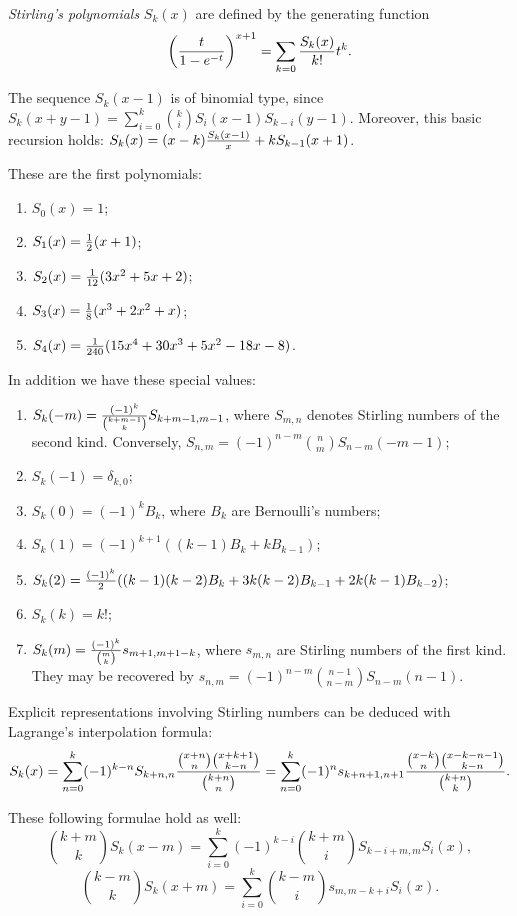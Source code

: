 \documentclass[12pt]{article}
\begin{document}
\emph{Stirling's polynomials}  $S_k(x)$ are defined by the generating function $$\left( {t \over {1-e^{-t}}} \right) ^{x+1}= \sum_{k=0} {S_k(x) \over k!} t^k.$$

The sequence $S_k(x-1)$ is of binomial type, since $S_k(x+y-1)= \sum_{i=0}^k {k \choose i} S_i(x-1) S_{k-i}(y-1)$. Moreover, this basic recursion holds: $S_k(x)= (x-k) {S_k(x-1) \over x} + k S_{k-1}(x+1)$. 

These are the first polynomials:
\begin{enumerate}
 \item $S_0(x)=1$;
 \item $S_1(x)= {1 \over 2}(x+1)$;
 \item $S_2(x)= {1 \over 12} (3 x^2 + 5x+ 2)$;
 \item $S_3(x)= {1 \over 8} (x^3+2 x^2+x)$;
 \item $S_4(x)= {1 \over 240} (15 x^4+ 30 x^3+5 x^2- 18x-8)$.
\end{enumerate}

In addition we have these special values:
\begin{enumerate}
 \item $S_k(-m)= {(-1)^k \over {k+m-1 \choose k}} S_{k+m-1,m-1}$, where $S_{m,n}$ denotes Stirling numbers of the second kind. Conversely, $S_{n,m}=(-1)^{n-m} {n \choose m} S_{n-m}(-m-1)$;
 \item $S_k(-1)= \delta_{k,0}$;
 \item $S_k(0)= (-1)^k B_k$, where $B_k$ are Bernoulli's numbers;
 \item $S_k(1)= (-1)^{k+1} ((k-1) B_k+ k B_{k-1})$;
 \item $S_k(2)= {(-1)^{k}\over 2} ((k-1)(k-2) B_k+ 3 k(k-2) B_{k-1}+ 2 k(k-1) B_{k-2})$;
 \item $S_k(k)= k!$;
 \item $S_k(m)= {(-1)^k \over {m \choose k}} s_{m+1, m+1-k}$, where $s_{m,n}$ are Stirling numbers of the first kind. They may be recovered by $s_{n,m}= (-1)^{n-m} {n-1 \choose n-m} S_{n-m}(n-1)$.
\end{enumerate}


Explicit representations involving Stirling numbers can be deduced with Lagrange's interpolation formula: $$S_k(x)= \sum_{n=0}^k (-1)^{k-n} S_{k+n,n} {{x+n \choose n} {x+k+1 \choose k-n} \over {k+n \choose n}} = \sum_{n=0}^k (-1)^n s_{k+n+1,n+1} {{x-k \choose n} {x-k-n-1 \choose k-n} \over {k+n \choose k}}.$$

These following formulae hold as well:
$${k+m \choose k} S_k(x-m)= \sum_{i=0}^k (-1)^{k-i} {k+m \choose i} S_{k-i+m,m} S_i(x),$$
$${k-m \choose k} S_k(x+m)= \sum_{i=0}^k {k-m \choose i} s_{m,m-k+i} S_i(x).$$
\end{document}

